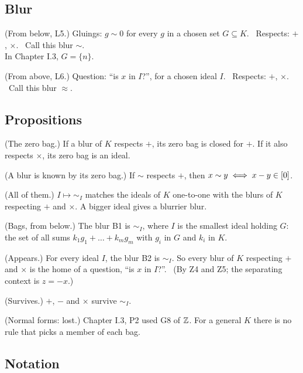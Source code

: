 \subsection*{Blur}

\begin{lines}
\item[\lab{B1}] (From below, L5.) Gluings: $g \sim 0$ for every $g$ in a chosen set $G \subseteq K$. \ Respects: $+$, $\times$. \ Call this blur $\sim$. \\
In Chapter I.3, $G = \{n\}$.
\item[\lab{B2}] (From above, L6.) Question: ``is $x$ in $I$?'', for a chosen ideal $I$. \ Respects: $+$, $\times$. \ Call this blur $\approx$.
\end{lines}

\subsection*{Propositions}

\begin{lines}
\item[\lab{P1}] (The zero bag.) If a blur of $K$ respects $+$, its zero bag is closed for $+$. If it also respects $\times$, its zero bag is an ideal.
\item[\lab{P2}] (A blur is known by its zero bag.) If $\sim$ respects $+$, then $x \sim y \iff x - y \in [0]$.
\item[\lab{P3}] (All of them.) $I \mapsto {\sim_I}$ matches the ideals of $K$ one-to-one with the blurs of $K$ respecting $+$ and $\times$. A bigger ideal gives a blurrier blur.
\item[\lab{P4}] (Bags, from below.) The blur B1 is $\sim_I$, where $I$ is the smallest ideal holding $G$: the set of all sums $k_1 g_1 + \dots + k_m g_m$ with $g_i$ in $G$ and $k_i$ in $K$.
\item[\lab{P5}] (Appears.) For every ideal $I$, the blur B2 is $\sim_I$. So every blur of $K$ respecting $+$ and $\times$ is the home of a question, ``is $x$ in $I$?''. \ (By Z4 and Z5; the separating context is $z = -x$.)
\item[\lab{P6}] (Survives.) $+$, $-$ and $\times$ survive $\sim_I$.
\item[\lab{P7}] (Normal forms: lost.) Chapter I.3, P2 used G8 of $\mathbb{Z}$. For a general $K$ there is no rule that picks a member of each bag.
\end{lines}

\subsection*{Notation}

